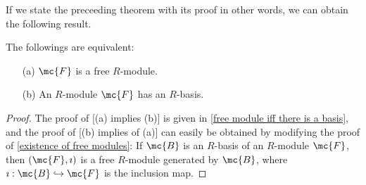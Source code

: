 If we state the preceeding theorem with its proof in other words, we can obtain the following result.
\begin{thm}
    The followings are equivalent:
    \begin{enumerate}
        \item[(a)]
        {
            $\mc{F}$ is a free $R$-module.
        }
        \item[(b)]
        {
            An $R$-module $\mc{F}$ has an $R$-basis.
        }
    \end{enumerate}
\end{thm}
\begin{proof}
    The proof of [(a) implies (b)] is given in \cref{free module iff there is a basis}, and the proof of [(b) implies of (a)] can easily be obtained by modifying the proof of \cref{existence of free modules}: If $\mc{B}$ is an $R$-basis of an $R$-module $\mc{F}$, then $(\mc{F}, \imath)$ is a free $R$-module generated by $\mc{B}$, where $\imath: \mc{B}\hookrightarrow\mc{F}$ is the inclusion map.
\end{proof}
